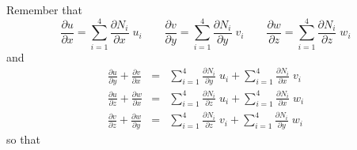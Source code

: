 Remember that
\[
\frac{\partial u}{\partial x} = \sum_{i=1}^4 \frac{\partial N_i}{\partial x}\;  u_i 
\quad\quad
\frac{\partial v}{\partial y} = \sum_{i=1}^4 \frac{\partial N_i}{\partial y}\;  v_i 
\quad\quad
\frac{\partial w}{\partial z} = \sum_{i=1}^4 \frac{\partial N_i}{\partial z}\;  w_i 
\]
and 
\begin{eqnarray}
\frac{\partial u}{\partial y} +\frac{\partial v}{\partial x} 
&=& \sum_{i=1}^4 \frac{\partial N_i}{\partial y}\;  u_i
+ \sum_{i=1}^4 \frac{\partial N_i}{\partial x}\;  v_i \nonumber\\
\frac{\partial u}{\partial z} +\frac{\partial w}{\partial x} 
&=& \sum_{i=1}^4 \frac{\partial N_i}{\partial z}\;  u_i
+ \sum_{i=1}^4 \frac{\partial N_i}{\partial x}\;  w_i \nonumber\\
\frac{\partial v}{\partial z} +\frac{\partial w}{\partial y} 
&=& \sum_{i=1}^4 \frac{\partial N_i}{\partial z}\;  v_i
+ \sum_{i=1}^4 \frac{\partial N_i}{\partial y}\;  w_i \nonumber
\end{eqnarray}
so that
